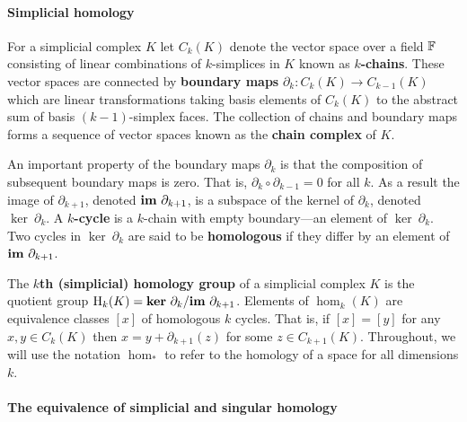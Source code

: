 
\paragraph{Simplicial homology}

For a simplicial complex $K$ let $C_k(K)$ denote the vector space over a field $\mathbb{F}$ consisting of linear combinations of $k$-simplices in $K$ known as \textbf{$k$-chains}.
These vector spaces are connected by \textbf{boundary maps} $\partial_k: C_k(K)\to C_{k-1}(K)$ which are linear transformations taking basis elements of $C_k(K)$ to the abstract sum of basis $(k-1)$-simplex faces.
The collection of chains and boundary maps forms a sequence of vector spaces known as the \textbf{chain complex} of $K$.

An important property of the boundary maps $\partial_k$ is that the composition of subsequent boundary maps is zero.
That is, $\partial_k\circ\partial_{k-1} = 0$ for all $k$.
As a result the image of $\partial_{k+1}$, denoted $\mathbf{im}~\partial_{k+1}$, is a subspace of the kernel of $\partial_k$, denoted $\ker~\partial_k$.
A \textbf{$k$-cycle} is a $k$-chain with empty boundary---an element of $\ker~\partial_k$.
Two cycles in $\ker~\partial_k$ are said to be \textbf{homologous} if they differ by an element of $\mathbf{im}~\partial_{k+1}$.

The \textbf{$k$th (simplicial) homology group} of a simplicial complex $K$ is the quotient group $\mathrm{H}_k(K) = \mathbf{ker}~\partial_k/\mathbf{im}~\partial_{k+1}$.
Elements of $\hom_k(K)$ are equivalence classes $[x]$ of homologous $k$ cycles.
That is, if $[x] = [y]$ for any $x,y\in C_k(K)$ then $x = y +\partial_{k+1}(z)$ for some $z\in C_{k+1}(K)$.
Throughout, we will use the notation $\hom_*$ to refer to the homology of a space for all dimensions $k$.

\paragraph{The equivalence of simplicial and singular homology}


